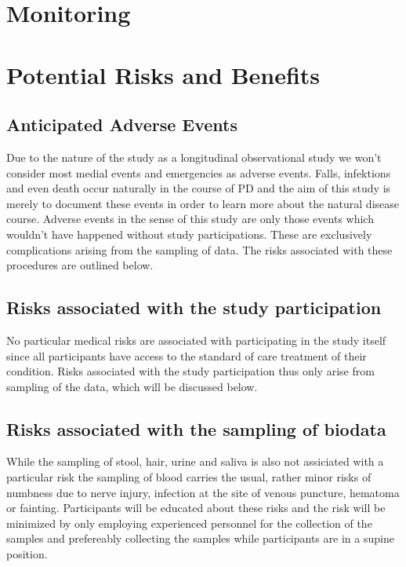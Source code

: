 \section{Monitoring}

\section{Potential Risks and Benefits}

\subsection{Anticipated Adverse Events}
Due to the nature of the study as a longitudinal observational study
we won't consider most medial events and emergencies as adverse
events. Falls, infektions and even death occur naturally in the course
of \ac{PD} and the aim of this study is merely to document these
events in order to learn more about the natural disease
course. Adverse events in the sense of this study are only those
events which wouldn't have happened without study
participations. These are exclusively complications arising from the
sampling of data. The risks associated with these procedures are
outlined below.

\subsection{Risks associated with the study participation}
No particular medical risks are associated with participating in the
study itself since all participants have access to the standard of
care treatment of their condition. Risks associated with the study
participation thus only arise from sampling of the data, which will be
discussed below.

\subsection{Risks associated with the sampling of biodata}
While the sampling of stool, hair, urine and saliva is also not
assiciated with a particular risk the sampling of blood carries the
usual, rather minor risks of numbness due to nerve injury, infection
at the site of venous puncture, hematoma or fainting. Participants
will be educated about these risks and the risk will be minimized by
only employing experienced personnel for the collection of the samples
and prefereably collecting the samples while participants are in a
supine position.

